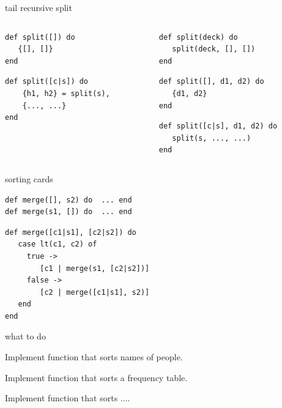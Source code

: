 \begin{frame}[fragile]{tail recursive split}

\begin{columns}

 \begin{column}{0.5\linewidth}
\begin{verbatim}
def split([]) do
   {[], []}
end
\end{verbatim}
\pause
\begin{verbatim}
def split([c|s]) do
    {h1, h2} = split(s),
    {..., ...}
end
\end{verbatim}
 \end{column}
 
 \pause

 \begin{column}{0.5\linewidth}
\begin{verbatim}
def split(deck) do 
   split(deck, [], [])
end
\end{verbatim}

\pause
\begin{verbatim}
def split([], d1, d2) do
   {d1, d2}
end
\end{verbatim}
\pause
\begin{verbatim}
def split([c|s], d1, d2) do
   split(s, ..., ...)
end
\end{verbatim}
 \end{column}
\end{columns}

\end{frame}

\begin{frame}[fragile]{sorting cards}

\begin{verbatim}
def merge([], s2) do  ... end
def merge(s1, []) do  ... end
\end{verbatim}
\pause
\begin{verbatim}
def merge([c1|s1], [c2|s2]) do 
   case lt(c1, c2) of
     true ->
        [c1 | merge(s1, [c2|s2])]
     false ->
        [c2 | merge([c1|s1], s2)]
   end
end
\end{verbatim}

\end{frame}

\begin{frame}{what to do}

\pause Implement function that sorts names of people.

\pause Implement function that sorts a frequency table.

\pause Implement function that sorts ....


\end{frame}

